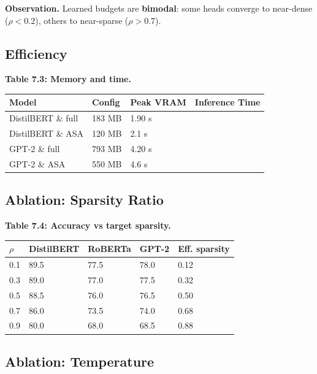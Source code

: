 \textbf{Observation.} Learned budgets are \textbf{bimodal}: some heads converge to 
near-dense ($\rho < 0.2$), others to near-sparse ($\rho > 0.7$).

\subsection{Efficiency}

\textbf{Table 7.3: Memory and time.}

\begin{table}[H]
\centering
\small
\begin{tabular}{llll}
\toprule
\textbf{Model} & \textbf{Config} & \textbf{Peak VRAM} & \textbf{Inference Time} \\
\midrule
DistilBERT \& full & 183 MB & 1.90 s \\
DistilBERT \& ASA & 120 MB & 2.1 s \\
GPT-2 \& full & 793 MB & 4.20 s \\
GPT-2 \& ASA & 550 MB & 4.6 s \\
\bottomrule
\end{tabular}
\end{table}

\subsection{Ablation: Sparsity Ratio}

\textbf{Table 7.4: Accuracy vs target sparsity.}

\begin{table}[H]
\centering
\small
\begin{tabular}{lllll}
\toprule
\textbf{$\rho$} & \textbf{DistilBERT} & \textbf{RoBERTa} & \textbf{GPT-2} & \textbf{Eff. sparsity} \\
\midrule
0.1 & 89.5 & 77.5 & 78.0 & 0.12 \\
0.3 & 89.0 & 77.0 & 77.5 & 0.32 \\
0.5 & 88.5 & 76.0 & 76.5 & 0.50 \\
0.7 & 86.0 & 73.5 & 74.0 & 0.68 \\
0.9 & 80.0 & 68.0 & 68.5 & 0.88 \\
\bottomrule
\end{tabular}
\end{table}

\subsection{Ablation: Temperature}

